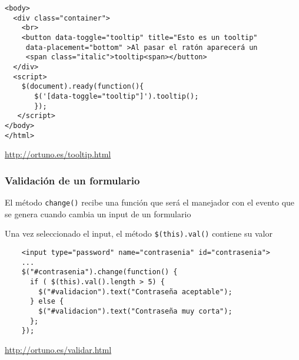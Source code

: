 \documentclass[ucs]{beamer}
\begin{document}
\begin{frame}[fragile]

  \begin{scriptsize}
  \begin{verbatim}
<body>
  <div class="container">
    <br>
    <button data-toggle="tooltip" title="Esto es un tooltip" 
     data-placement="bottom" >Al pasar el ratón aparecerá un 
     <span class="italic">tooltip<span></button>
  </div>
  <script>
    $(document).ready(function(){
       $('[data-toggle="tooltip"]').tooltip();
       });
   </script>
</body>
</html>
  \end{verbatim}
  \end{scriptsize}

\begin{tiny}
\begin{flushright}
\url{http://ortuno.es/tooltip.html}
\end{flushright}
\end{tiny}
\end{frame}


\begin{frame}[fragile]
\frametitle{Validación de un formulario}

El método
\verb|change()|
recibe una función que será el manejador con el evento que se genera
cuando cambia un input de un formulario 

Una vez seleccionado el input, el método 
\verb|$(this).val()|
contiene su valor

  \begin{scriptsize}
  \begin{verbatim}
    <input type="password" name="contrasenia" id="contrasenia">
    ...
    $("#contrasenia").change(function() {
      if ( $(this).val().length > 5) {
        $("#validacion").text("Contraseña aceptable");
      } else {
        $("#validacion").text("Contraseña muy corta");
      };
    });
  \end{verbatim}
  \end{scriptsize}

\begin{tiny}
\begin{flushright}
\url{http://ortuno.es/validar.html}
\end{flushright}
\end{tiny}
\end{frame}
\end{document}
